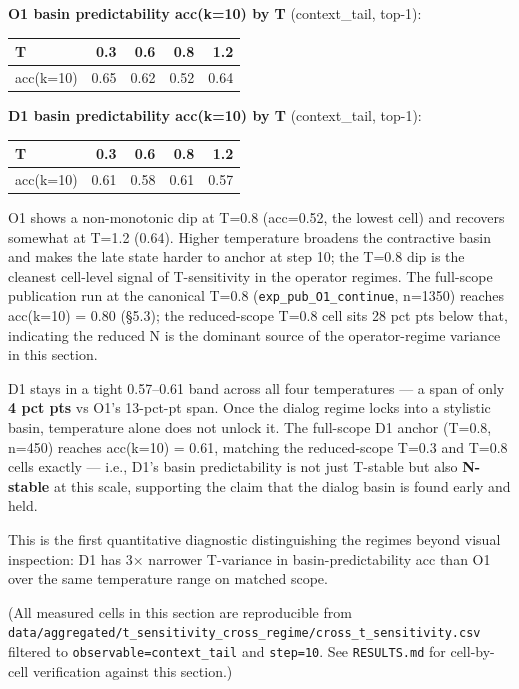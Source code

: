 \documentclass{article}
\theoremstyle{plain}
\theoremstyle{definition}
\begin{document}
\textbf{O1 basin predictability acc(k=10) by T} (context\_tail, top-1):

\begin{table}[h!]
\centering
\small
\begin{tabular}{lrrrr}
\toprule
T & 0.3 & 0.6 & 0.8 & 1.2 \\
\midrule
acc(k=10) & 0.65 & 0.62 & 0.52 & 0.64 \\
\bottomrule
\end{tabular}
\end{table}

\textbf{D1 basin predictability acc(k=10) by T} (context\_tail, top-1):

\begin{table}[h!]
\centering
\small
\begin{tabular}{lrrrr}
\toprule
T & 0.3 & 0.6 & 0.8 & 1.2 \\
\midrule
acc(k=10) & 0.61 & 0.58 & 0.61 & 0.57 \\
\bottomrule
\end{tabular}
\end{table}

O1 shows a non-monotonic dip at T=0.8 (acc=0.52, the lowest cell) and
recovers somewhat at T=1.2 (0.64). Higher temperature broadens the
contractive basin and makes the late state harder to anchor at step
10; the T=0.8 dip is the cleanest cell-level signal of T-sensitivity
in the operator regimes. The full-scope publication run at the
canonical T=0.8 (\texttt{exp\_pub\_O1\_continue}, n=1350) reaches acc(k=10) =
0.80 (§5.3); the reduced-scope T=0.8 cell sits 28 pct pts below
that, indicating the reduced N is the dominant source of the
operator-regime variance in this section.

D1 stays in a tight 0.57–0.61 band across all four temperatures —
a span of only \textbf{4 pct pts} vs O1's 13-pct-pt span. Once the dialog
regime locks into a stylistic basin, temperature alone does not
unlock it. The full-scope D1 anchor (T=0.8, n=450) reaches acc(k=10)
= 0.61, matching the reduced-scope T=0.3 and T=0.8 cells exactly —
i.e., D1's basin predictability is not just T-stable but also
\textbf{N-stable} at this scale, supporting the claim that the dialog
basin is found early and held.

This is the first quantitative diagnostic distinguishing the regimes
beyond visual inspection: D1 has 3× narrower T-variance in
basin-predictability acc than O1 over the same temperature range
on matched scope.

(All measured cells in this section are reproducible from
\texttt{data/aggregated/t\_sensitivity\_cross\_regime/cross\_t\_sensitivity.csv}
filtered to \texttt{observable=context\_tail} and \texttt{step=10}. See
\texttt{RESULTS.md} for cell-by-cell verification against this section.)
\end{document}
